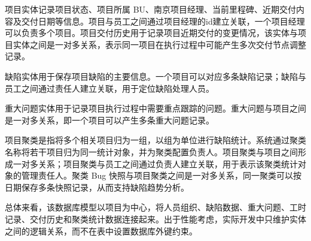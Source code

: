 项目实体记录项目状态、项目所属 BU、南京项目经理、当前里程碑、近期交付内容及交付日期等信息。项目与员工之间通过项目经理的id建立关联，一个项目经理可以负责多个项目。项目交付历史用于记录项目近期交付的变更情况，该实体与项目实体之间是一对多关系，表示同一项目在执行过程中可能产生多次交付节点调整记录。

缺陷实体用于保存项目缺陷的主要信息。一个项目可以对应多条缺陷记录；缺陷与员工之间通过责任人建立关联，用于定位缺陷处理人员。

重大问题实体用于记录项目执行过程中需要重点跟踪的问题。重大问题与项目之间是一对多关系，即一个项目可以产生多条重大问题记录。

项目聚类是指将多个相关项目归为一组，以组为单位进行缺陷统计。系统通过聚类名称将若干项目归为同一统计对象，并为聚类配置负责人。项目聚类与项目之间形成一对多关系；项目聚类与员工之间通过负责人建立关联，用于表示该聚类统计对象的管理责任人。聚类 Bug 快照与项目聚类之间是一对多关系，同一聚类可以按日期保存多条快照记录，从而支持缺陷趋势分析。

总体来看，该数据库模型以项目为中心，将人员组织、缺陷数据、重大问题、工时记录、交付历史和聚类统计数据连接起来。出于性能考虑，实际开发中只维护实体之间的逻辑关系，而不在表中设置数据库外键约束。

